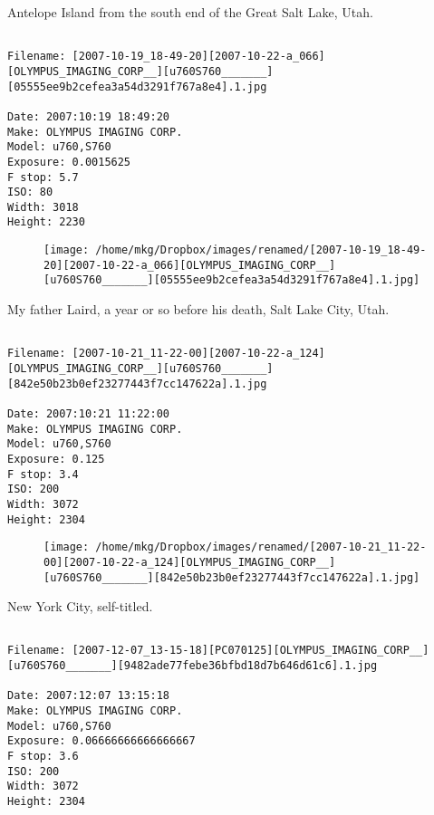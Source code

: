 \clearpage
\onecolumn
\noindent Antelope Island from the south end of the Great Salt Lake, Utah.
\noindent
\begin{lstlisting}

Filename: [2007-10-19_18-49-20][2007-10-22-a_066][OLYMPUS_IMAGING_CORP__][u760S760_______][05555ee9b2cefea3a54d3291f767a8e4].1.jpg

Date: 2007:10:19 18:49:20
Make: OLYMPUS IMAGING CORP.  
Model: u760,S760       
Exposure: 0.0015625
F stop: 5.7
ISO: 80
Width: 3018
Height: 2230
\end{lstlisting}
\clearpage

\begin{figure}
\texttt{[image: /home/mkg/Dropbox/images/renamed/[2007-10-19\_18-49-20][2007-10-22-a\_066][OLYMPUS\_IMAGING\_CORP\_\_][u760S760\_\_\_\_\_\_\_][05555ee9b2cefea3a54d3291f767a8e4].1.jpg]}
\end{figure}
    
\clearpage
\onecolumn
\noindent My father Laird, a year or so before his death, Salt Lake City, Utah.
\noindent
\begin{lstlisting}

Filename: [2007-10-21_11-22-00][2007-10-22-a_124][OLYMPUS_IMAGING_CORP__][u760S760_______][842e50b23b0ef23277443f7cc147622a].1.jpg

Date: 2007:10:21 11:22:00
Make: OLYMPUS IMAGING CORP.  
Model: u760,S760       
Exposure: 0.125
F stop: 3.4
ISO: 200
Width: 3072
Height: 2304
\end{lstlisting}
\clearpage

\begin{figure}
\texttt{[image: /home/mkg/Dropbox/images/renamed/[2007-10-21\_11-22-00][2007-10-22-a\_124][OLYMPUS\_IMAGING\_CORP\_\_][u760S760\_\_\_\_\_\_\_][842e50b23b0ef23277443f7cc147622a].1.jpg]}
\end{figure}
    
\clearpage
\onecolumn
\noindent New York City, self-titled.
\noindent
\begin{lstlisting}

Filename: [2007-12-07_13-15-18][PC070125][OLYMPUS_IMAGING_CORP__][u760S760_______][9482ade77febe36bfbd18d7b646d61c6].1.jpg

Date: 2007:12:07 13:15:18
Make: OLYMPUS IMAGING CORP.  
Model: u760,S760       
Exposure: 0.06666666666666667
F stop: 3.6
ISO: 200
Width: 3072
Height: 2304
\end{lstlisting}
\clearpage


